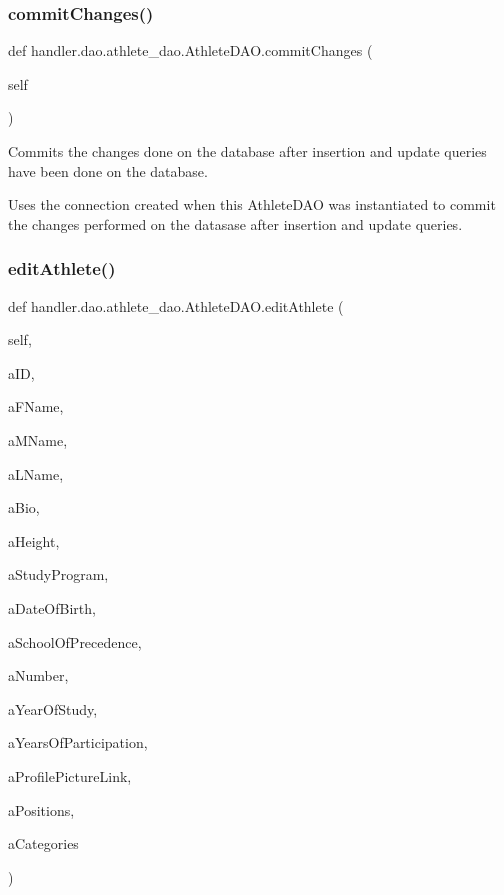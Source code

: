 \subsubsection{\texorpdfstring{commit\+Changes()}{commitChanges()}}
{\footnotesize\ttfamily def handler.\+dao.\+athlete\+\_\+dao.\+Athlete\+D\+A\+O.\+commit\+Changes (\begin{DoxyParamCaption}\item[{}]{self }\end{DoxyParamCaption})}

\begin{DoxyVerb}Commits the changes done on the database after
insertion and update queries have been done on the
database.

Uses the connection created when this AthleteDAO was
instantiated to commit the changes performed on the datasase
after insertion and update queries. 
\end{DoxyVerb}
 \mbox{\label{classhandler_1_1dao_1_1athlete__dao_1_1_athlete_d_a_o_a79d97bcfdc2ba5f68bfdf975f7c341b9}} 
\subsubsection{\texorpdfstring{edit\+Athlete()}{editAthlete()}}
{\footnotesize\ttfamily def handler.\+dao.\+athlete\+\_\+dao.\+Athlete\+D\+A\+O.\+edit\+Athlete (\begin{DoxyParamCaption}\item[{}]{self,  }\item[{}]{a\+ID,  }\item[{}]{a\+F\+Name,  }\item[{}]{a\+M\+Name,  }\item[{}]{a\+L\+Name,  }\item[{}]{a\+Bio,  }\item[{}]{a\+Height,  }\item[{}]{a\+Study\+Program,  }\item[{}]{a\+Date\+Of\+Birth,  }\item[{}]{a\+School\+Of\+Precedence,  }\item[{}]{a\+Number,  }\item[{}]{a\+Year\+Of\+Study,  }\item[{}]{a\+Years\+Of\+Participation,  }\item[{}]{a\+Profile\+Picture\+Link,  }\item[{}]{a\+Positions,  }\item[{}]{a\+Categories }\end{DoxyParamCaption})}

